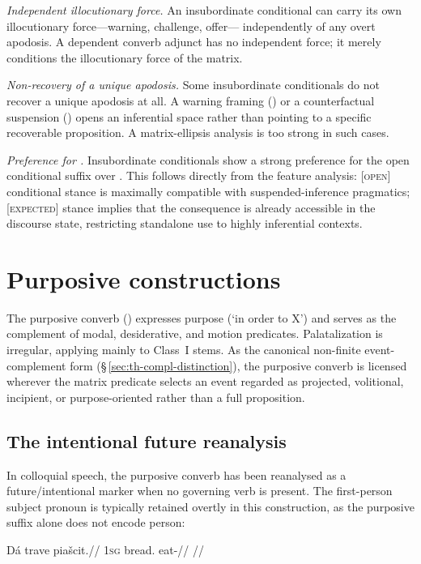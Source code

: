 \textit{Independent illocutionary force.} An insubordinate conditional
can carry its own illocutionary force---warning, challenge, offer---
independently of any overt apodosis. A dependent converb adjunct has no
independent force; it merely conditions the illocutionary force of the
matrix.

\textit{Non-recovery of a unique apodosis.} Some insubordinate
conditionals do not recover a unique apodosis at all. A warning framing
() or a counterfactual suspension () opens an inferential space rather than pointing to a
specific recoverable proposition. A matrix-ellipsis analysis is too
strong in such cases.

\textit{Preference for .} Insubordinate conditionals show a
strong preference for the open conditional suffix over .
This follows directly from the feature analysis: [\textsc{open}]
conditional stance is maximally compatible with suspended-inference
pragmatics; [\textsc{expected}] stance implies that the consequence is
already accessible in the discourse state, restricting standalone use
to highly inferential contexts.

\section{Purposive constructions}\label{sec:purposive}

The purposive converb () expresses purpose (`in order to X') and serves
as the complement of modal, desiderative, and motion predicates. Palatalization
is irregular, applying mainly to Class~I stems. As the canonical non-finite
event-complement form (§\,\ref{sec:th-compl-distinction}), the purposive converb
is licensed wherever the matrix predicate selects an event regarded as
projected, volitional, incipient, or purpose-oriented rather than a full
proposition.

\subsection{The intentional future reanalysis}\label{sec:purp-intentional}

In colloquial speech, the purposive converb has been reanalysed as a
future/intentional marker when no governing verb is present. The first-person
subject pronoun  is typically retained overtly in this construction, as
the purposive suffix alone does not encode person:

\ex
\begingl
\gla Dá trave piašcit.//
\glb \textsc{1sg} bread.\Ind{} eat-\Purp{}//
\glft {} //
\endgl
\xe

